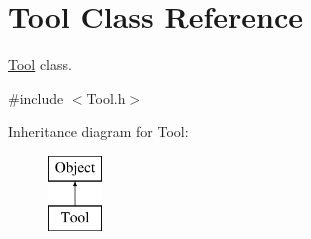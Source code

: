 \hypertarget{classTool}{\section{Tool Class Reference}
\label{classTool}
}


\hyperlink{classTool}{Tool} class.  




{\ttfamily \#include $<$Tool.\-h$>$}

Inheritance diagram for Tool\-:\begin{figure}[H]
\begin{center}
\leavevmode
\includegraphics[height=2.000000cm]{classTool}
\end{center}
\end{figure}
